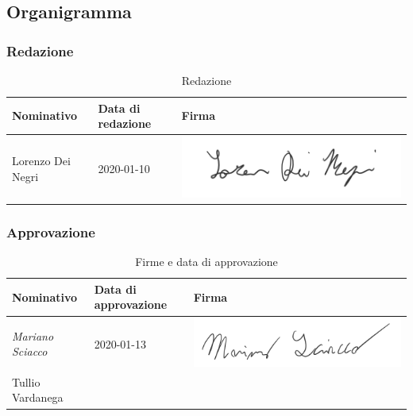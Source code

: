 	\subsection{Organigramma}
		
		\subsubsection{Redazione}
			
			\begin{table}[!h]
				\centering
					\begin{tabular}{|l|l|l|}
						\hline
						\textbf{Nominativo} & \textbf{Data di redazione} & \textbf{Firma} \\ \hline
						Lorenzo Dei Negri & 2020-01-10 &  \includegraphics[scale=0.6]{images/firme/lorenzo} \\ \hline
					\end{tabular}
				\caption{Redazione}
			\end{table}
		
		\subsubsection{Approvazione}
			
			\begin{table}[!h]
				\centering
				\begin{tabular}{|l|l|l|}
					\hline
					\textbf{Nominativo} & \textbf{Data di approvazione} & \textbf{Firma} \\ \hline
					\textit{Mariano Sciacco} & 2020-01-13 &  \includegraphics[scale=0.6]{images/firme/mariano}  \\ \hline
					Tullio Vardanega &  & \\ \hline
				\end{tabular}
				\caption{Firme e data di approvazione}
			\end{table}
			
